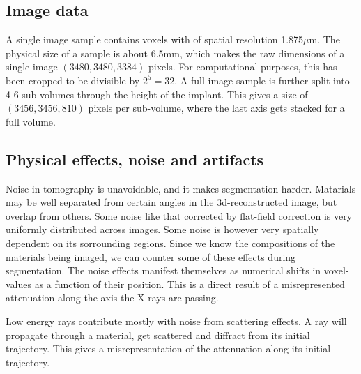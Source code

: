 

\subsection{Image data}

A single image sample contains voxels with of spatial resolution 1.875$\mu$m. The physical size of
a sample is about 6.5mm, which makes the raw dimensions of a single image $(3480,3480,3384)$ pixels.
For computational purposes, this has been cropped to be divisible by $2^5=32$. A full image sample
is further split into 4-6 sub-volumes through the height of the implant. This gives a size of $(3456,3456,810)$ pixels per sub-volume, where the last axis gets stacked for a full volume.



\subsection{Physical effects, noise and artifacts}

Noise in tomography is unavoidable, and it makes segmentation harder. Matarials may be well separated from certain angles in the 3d-reconstructed image, but overlap from others. Some noise like that corrected by flat-field correction is very uniformly distributed across images. Some noise is however very spatially dependent on its sorrounding regions. Since we know the compositions of the materials being imaged, we can counter some of these effects during segmentation. The noise effects manifest themselves as numerical shifts in voxel-values as a function of their position. This is a direct result of a misrepresented attenuation along the axis the X-rays are passing. 


Low energy rays contribute mostly with noise from scattering effects. A ray will propagate through a material, get scattered and diffract from its initial trajectory. This gives a misrepresentation of the attenuation along its initial trajectory.

